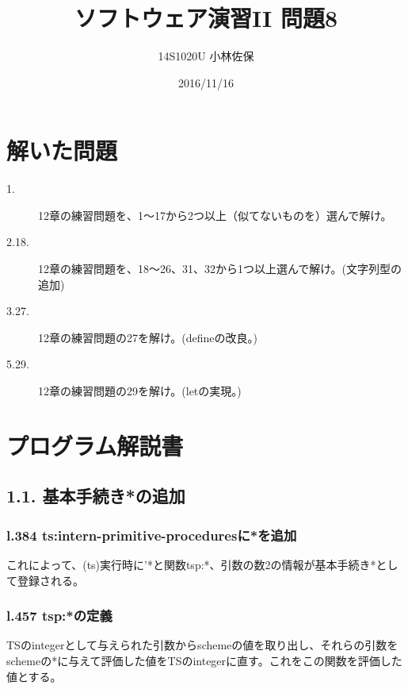 \documentclass{jarticle}
\begin{document}
\begin{titlepage}
\title{ソフトウェア演習II 問題8}
\date{2016/11/16}
\author{14S1020U 小林佐保}
\maketitle
\thispagestyle{empty}
\end{titlepage}
\section{解いた問題}

\begin{description}
 \item[1.] 12章の練習問題を、1～17から2つ以上（似てないものを）選んで解け。
 \item[2.18.] 12章の練習問題を、18～26、31、32から1つ以上選んで解け。(文字列型の追加)
 \item[3.27.] 12章の練習問題の27を解け。(defineの改良。)
 \item[5.29.] 12章の練習問題の29を解け。(letの実現。)
\end{description}

\section{プログラム解説書}
\subsection{1.1. 基本手続き*の追加}
\subsubsection{l.384 ts:intern-primitive-proceduresに*を追加}
これによって、(ts)実行時に'*と関数tsp:*、引数の数2の情報が基本手続き*として登録される。\par
\subsubsection{l.457 tsp:*の定義}
TSのintegerとして与えられた引数からschemeの値を取り出し、それらの引数をschemeの*に与えて評価した値をTSのintegerに直す。これをこの関数を評価した値とする。\par
\end{document}

